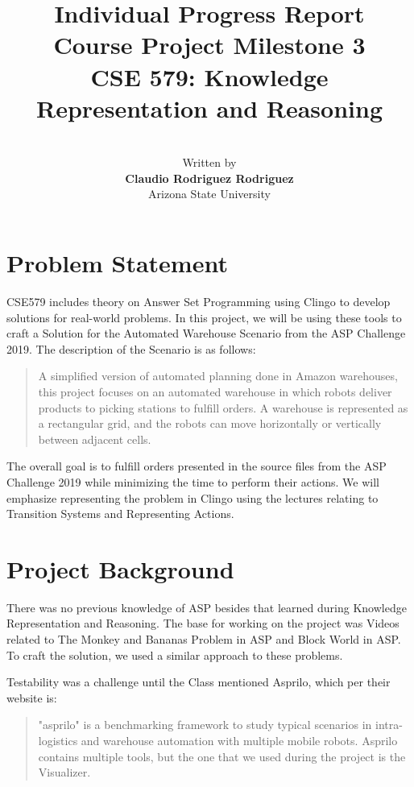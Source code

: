 \documentclass[letterpaper]{article} %
\title{Individual Progress Report\\
Course Project Milestone 3\\
CSE 579: Knowledge Representation and Reasoning}
\author{ \\
Written by\\
\Large \textbf{Claudio Rodriguez Rodriguez} \\ 
Arizona State University}
\begin{document}
\maketitle

\section{Problem Statement}

CSE579 includes theory on Answer Set Programming using Clingo to develop solutions for real-world problems. In this project, we will be using these tools to craft a Solution for the Automated Warehouse Scenario from the ASP Challenge 2019. The description of the Scenario is as follows:

\begin{quotation}
A simplified version of automated planning done in Amazon warehouses, this project focuses on an automated warehouse in which robots deliver products to picking stations to fulﬁll orders. A warehouse is represented as a rectangular grid, and the robots can move horizontally or vertically between adjacent cells.\cite{cse579:CourseProject}
\end{quotation}

The overall goal is to fulfill orders presented in the source files from the ASP Challenge 2019 while minimizing the time to perform their actions. We will emphasize representing the problem in Clingo using the lectures relating to Transition Systems and Representing Actions.


\section{Project Background}

There was no previous knowledge of ASP besides that learned during Knowledge Representation and Reasoning. The base for working on the project was Videos related to The Monkey and Bananas Problem in ASP\cite{cse579:CourseMonkeyAndBananasPart1}\cite{cse579:CourseMonkeyAndBananasPart2} and Block World in ASP\cite{cse579:CourseBlocksWorld}. To craft the solution, we used a similar approach to these problems.

Testability was a challenge until the Class mentioned Asprilo, which per their website is:

\begin{quotation}
"asprilo" is a benchmarking framework to study typical scenarios in intra-logistics and warehouse automation with multiple mobile robots. 
Asprilo contains multiple tools, but the one that we used during the project is the Visualizer.\cite{cse579:asprilo}
\end{quotation}
\end{document}
